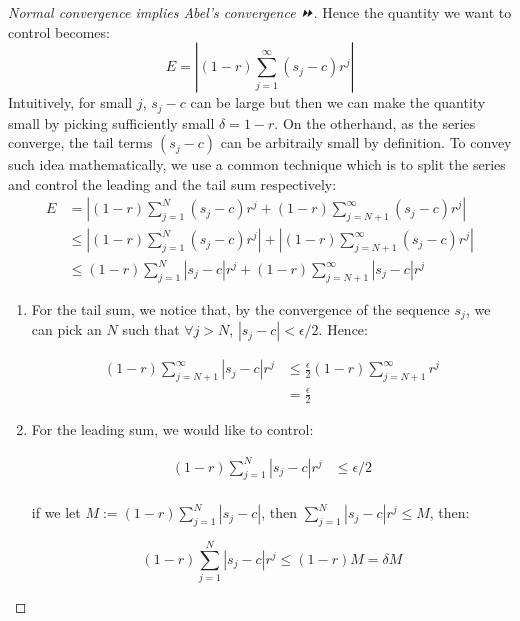\begin{proof}[Normal convergence implies Abel's convergence ⏩]
Hence the quantity we want to control becomes:
\begin{equation}
E=\left| (1-r)\sum_{j=1}^{\infty} (s_j-c)r^j\right|
\end{equation}
Intuitively, for small $j$, $s_j -c$ can be large but then we can make the quantity small by picking sufficiently small $\delta=1 -r$. On the otherhand, as the series converge, the tail terms $(s_j -c)$ can be arbitraily small by definition. To convey such idea mathematically, we use a common technique which is to split the series and control the leading and the tail sum respectively:
\begin{equation}
\begin{aligned}
E &= \left| (1-r)\sum_{j=1}^{N} (s_j-c)r^j + (1-r)\sum_{j=N+1}^{\infty} (s_j-c)r^j\right| \\
&\leq \left| (1-r)\sum_{j=1}^{N} (s_j-c)r^j \right| +  \left|(1-r)\sum_{j=N+1}^{\infty} (s_j-c)r^j\right| \\
&\leq  (1-r)\sum_{j=1}^{N} |s_j-c|r^j  +  (1-r)\sum_{j=N+1}^{\infty} |s_j-c|r^j
\end{aligned}
\end{equation}

\begin{enumerate}
\item For the tail sum, we notice that, by the convergence of the sequence $s_j$, we can pick an $N$ such that $\forall j > N$, $|s_j -c|<\epsilon/2$. Hence:

\begin{equation}
\begin{aligned}
(1-r)\sum_{j=N+1}^{\infty} |s_j-c|r^j &\leq \frac{\epsilon}{2}(1-r)\sum_{j=N+1}^{\infty} r^j \\ 
&= \frac{\epsilon}{2}
\end{aligned}
\end{equation}


\item For the leading sum, we would like to control:

\begin{equation}
\begin{aligned}
(1-r)\sum_{j=1}^{N} |s_j-c|r^j&\leq \epsilon/2 \\
\end{aligned}
\end{equation}


if we let $M:=(1 -r)\sum_{j=1}^{N} |s_j -c|$, then $\sum_{j=1}^{N} |s_j -c|r^j \leq M$, then:

\begin{equation}
(1-r)\sum_{j=1}^{N} |s_j-c|r^j\leq (1-r)M = \delta M
\end{equation}



\end{enumerate}
\end{proof}
